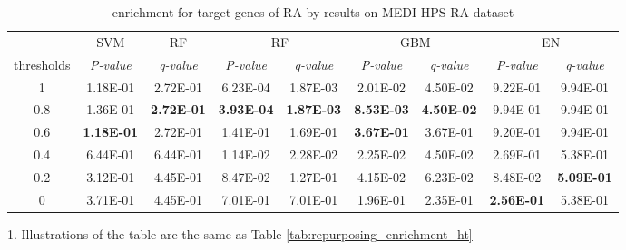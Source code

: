         \begin{table}[htbp]
          \centering
          \caption{enrichment for target genes of RA by results on MEDI-HPS RA dataset}
          \begin{threeparttable}
            \tabcolsep=0.10cm
            \begin{tabular}{ccccccccc}
              \toprule
                  & SVM   & RF    & \multicolumn{2}{c}{RF} & \multicolumn{2}{c}{GBM} & \multicolumn{2}{c}{EN} \\
            thresholds & \textit{P-value} & \textit{q-value} & \textit{P-value} & \textit{q-value} & \textit{P-value} & \textit{q-value} & \textit{P-value} & \textit{q-value} \\
            \midrule
            1     & 1.18E-01 & 2.72E-01 & 6.23E-04 & 1.87E-03 & 2.01E-02 & 4.50E-02 & 9.22E-01 & 9.94E-01 \\
            0.8   & 1.36E-01 & \textbf{2.72E-01} & \textbf{3.93E-04} & \textbf{1.87E-03} & \textbf{8.53E-03} & \textbf{4.50E-02} & 9.94E-01 & 9.94E-01 \\
            0.6   & \textbf{1.18E-01} & 2.72E-01 & 1.41E-01 & 1.69E-01 & \textbf{3.67E-01} & 3.67E-01 & 9.20E-01 & 9.94E-01 \\
            0.4   & 6.44E-01 & 6.44E-01 & 1.14E-02 & 2.28E-02 & 2.25E-02 & 4.50E-02 & 2.69E-01 & 5.38E-01 \\
            0.2   & 3.12E-01 & 4.45E-01 & 8.47E-02 & 1.27E-01 & 4.15E-02 & 6.23E-02 & 8.48E-02 & \textbf{5.09E-01} \\
            0     & 3.71E-01 & 4.45E-01 & 7.01E-01 & 7.01E-01 & 1.96E-01 & 2.35E-01 & \textbf{2.56E-01} & 5.38E-01 \\
            \bottomrule
            \end{tabular}%
            \begin{tablenotes}
              \item 1. Illustrations of the table are the same as Table \ref{tab:repurposing_enrichment_ht}
            \end{tablenotes}
          \end{threeparttable}
          \label{tab:repurposing_enrichment_ra}%
        \end{table}%

